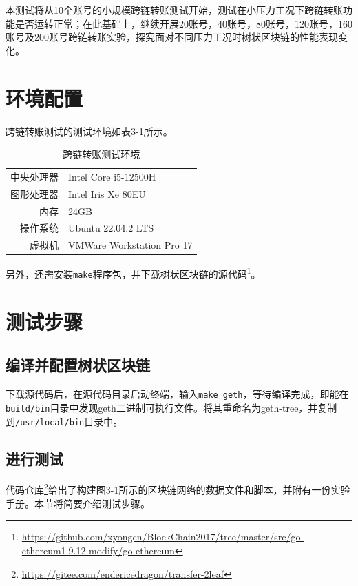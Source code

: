 本测试将从10个账号的小规模跨链转账测试开始，测试在小压力工况下跨链转账功能是否运转正常；在此基础上，继续开展20账号，40账号，80账号，120账号，160账号及200账号跨链转账实验，探究面对不同压力工况时树状区块链的性能表现变化。

\section{环境配置}

跨链转账测试的测试环境如表3-1所示。

\begin{table}[htbp]
    \linespread{1.5}
    \centering
    \caption{跨链转账测试环境}\label{跨链转账测试环境}
    \begin{tabular}{r|l} \toprule
        中央处理器 & Intel Core i5-12500H      \\
        图形处理器 & Intel Iris Xe 80EU        \\
        内存    & 24GB                      \\
        操作系统  & Ubuntu 22.04.2 LTS        \\
        虚拟机   & VMWare Workstation Pro 17 \\
        \bottomrule
    \end{tabular}
\end{table}

另外，还需安装\verb|make|程序包，并下载树状区块链的源代码\footnote{\url{https://github.com/xyongcn/BlockChain2017/tree/master/src/go-ethereum1.9.12-modify/go-ethereum}}。

\section{测试步骤}

\subsection{编译并配置树状区块链}

下载源代码后，在源代码目录启动终端，输入\verb|make geth|，等待编译完成，即能在\verb|build/bin|目录中发现geth二进制可执行文件。将其重命名为geth-tree，并复制到\verb|/usr/local/bin|目录中。

\subsection{进行测试}

代码仓库\footnote{\url{https://gitee.com/endericedragon/transfer-2leaf}}给出了构建图3-1所示的区块链网络的数据文件和脚本，并附有一份实验手册。本节将简要介绍测试步骤。

